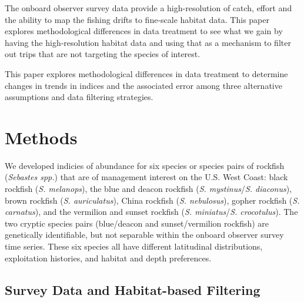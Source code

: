 \documentclass[
  12pt,
  authoryear,
  preprint,
  3p]{elsarticle}
\begin{document}
The onboard observer survey data provide a high-resolution of catch,
effort and the ability to map the fishing drifts to fine-scale habitat
data. This paper explores methodological differences in data treatment
to see what we gain by having the high-resolution habitat data and using
that as a mechanism to filter out trips that are not targeting the
species of interest.

This paper explores methodological differences in data treatment to
determine changes in trends in indices and the associated error among
three alternative assumptions and data filtering strategies.

\hypertarget{methods}{%
\section{Methods}\label{methods}}

We developed indicies of abundance for six species or species pairs of
rockfish (\emph{Sebastes spp.}) that are of management interest on the
U.S. West Coast: black rockfish (\emph{S. melanops}), the blue and
deacon rockfish (\emph{S. mystinus}/\emph{S. diaconus}), brown rockfish
(\emph{S. auriculatus}), China rockfish (\emph{S. nebulosus}), gopher
rockfish (\emph{S. carnatus}), and the vermilion and sunset rockfish
(\emph{S. miniatus}/\emph{S. crocotulus}). The two cryptic species pairs
(blue/deacon and sunset/vermilion rockfish) are genetically
identifiable, but not separable within the onboard observer survey time
series. These six species all have different latitudinal distributions,
exploitation histories, and habitat and depth
preferences\citep{Love:2002:RNP}.

\hypertarget{survey-data-and-habitat-based-filtering}{%
\subsection{Survey Data and Habitat-based
Filtering}\label{survey-data-and-habitat-based-filtering}}
\end{document}
